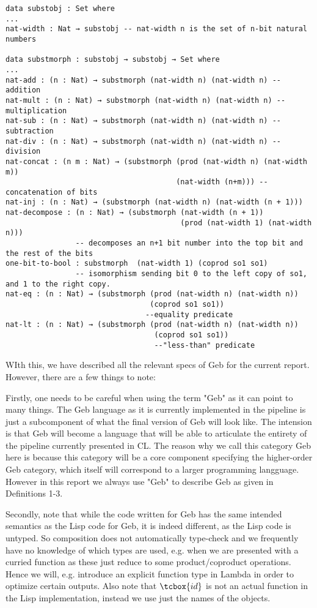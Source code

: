 \begin{verbatim}
data substobj : Set where
...
nat-width : Nat → substobj -- nat-width n is the set of n-bit natural numbers

data substmorph : substobj → substobj → Set where
...
nat-add : (n : Nat) → substmorph (nat-width n) (nat-width n) --addition
nat-mult : (n : Nat) → substmorph (nat-width n) (nat-width n) --multiplication
nat-sub : (n : Nat) → substmorph (nat-width n) (nat-width n) --subtraction
nat-div : (n : Nat) → substmorph (nat-width n) (nat-width n) --division 
nat-concat : (n m : Nat) → (substmorph (prod (nat-width n) (nat-width m))
                                       (nat-width (n+m))) -- concatenation of bits
nat-inj : (n : Nat) → (substmorph (nat-width n) (nat-width (n + 1)))
nat-decompose : (n : Nat) → (substmorph (nat-width (n + 1)) 
                                        (prod (nat-width 1) (nat-width n)))
                -- decomposes an n+1 bit number into the top bit and the rest of the bits
one-bit-to-bool : substmorph  (nat-width 1) (coprod so1 so1)
                -- isomorphism sending bit 0 to the left copy of so1, and 1 to the right copy.
nat-eq : (n : Nat) → (substmorph (prod (nat-width n) (nat-width n)) 
                                 (coprod so1 so1))
                                --equality predicate
nat-lt : (n : Nat) → (substmorph (prod (nat-width n) (nat-width n))
                                  (coprod so1 so1))
                                  --"less-than" predicate
\end{verbatim}

WIth this, we have described all the relevant specs of Geb for the current report. However, there are a few things to note:

Firstly, one needs to be careful when using the term "Geb" as it can point to many things. The Geb language as it is currently implemented in the pipeline is just a subcomponent of what the final version of Geb will look like. The intension is that Geb will become a language that will be able to articulate the entirety of the pipeline currently presented in CL. The reason why we call this category Geb here is because this category will be a core component specifying the higher-order Geb category, which itself will correspond to a larger programming langguage. However in this report we always use "Geb" to describe Geb as given in Definitions 1-3.

Secondly, note that while the code written for Geb has the same intended semantics as the Lisp code for Geb, it is indeed different, as the Lisp code is untyped. So composition does not automatically type-check and we frequently have no knowledge of which types are used, e.g. when we are presented with a curried function as these just reduce to some product/coproduct operations. Hence we will, e.g. introduce an explicit function type in Lambda in order to optimize certain outputs. Also note that $\tcbox{id}$ is not an actual function in the Lisp implementation, instead we use just the names of the objects.
 
